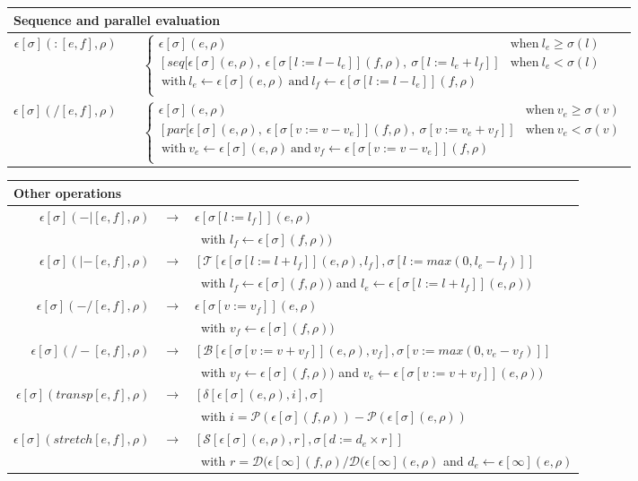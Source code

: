 \documentclass[10pt,a4paper,frenchb]{article}
\makeatletter
\newcommand{\evalsym}{\epsilon}
\newcommand{\eval}[2][\bounds]{\evalsym[#1](#2,\rho)}
\newcommand{\seq}			{:}
\newcommand{\mix}			{/}
\newcommand{\pitch}		{{\mathcal P}}
\newcommand{\dur}			{{\mathcal D}}
\newcommand{\tail}			{{\mathcal T}}
\newcommand{\bottom}		{{\mathcal B}}
\newcommand{\transp}		{\delta}
\renewcommand{\stretch}	{{\mathcal S}}
\newcommand{\bounds}		{\sigma}
\newcommand{\nobounds}	{\infty}
\newcommand{\evaltable}[1][$\rightarrow$]	  {\begin{center} \begin{tabular*}{0.9\linewidth}{rc@{ #1 }l}}
\newcommand{\evaltitle}[1]						{\multicolumn{3}{l}{#1} \\ \hline}
\newcommand{\evaltablend}  		{\end{tabular*}\end{center}}
\newcommand{\evalspace}	  		{\vspace{2mm}\\}
\makeatother
\begin{document}
\evaltable
\hline
\evaltitle {Sequence and parallel  evaluation} 
 $\eval{\seq [e,f]}$	& & $\left\{ \begin{array}{ll}
							\eval{e} & \mathrm{when} \  l_e \geq \bounds(l) \\
							\left[ seq[\eval{e}, \ \eval[{\bounds[l:=l- l_e]}]{f}, \ \bounds[l:=l_e + l_f] \right] & \mathrm{when} \  l_e < \bounds(l) \\
 								\ \mathrm{with} \   l_e \leftarrow \eval{e} \ \mathrm{and} \   l_f \leftarrow \eval[{\bounds[l:=l- l_e]}]{f} &\\
	 							\end{array} \right.$
\evalspace
 $\eval{\mix [e,f]}$	& & $\left\{ \begin{array}{ll}
							\eval{e} & \mathrm{when} \  v_e \geq \bounds(v) \\
							\left[ par[\eval{e}, \ \eval[{\bounds[v:=v- v_e]}]{f}, \ \bounds[v:=v_e + v_f] \right] & \mathrm{when} \  v_e < \bounds(v) \\
 								\ \mathrm{with} \   v_e \leftarrow \eval{e} \ \mathrm{and} \   v_f \leftarrow \eval[{\bounds[v:=v- v_e]}]{f} &\\
	 							\end{array} \right.$ 
\evaltablend

\evaltable[]
\hline
\evaltitle {Other operations} 
 $\eval{-| [e,f]}$			& $\rightarrow$ & $\eval [{\bounds[l:=l_f]}] {e}$  \\
 					& & \ with $l_f \leftarrow \eval{f})$ 
\evalspace
  $\eval{|- [e,f]}$		   	& $\rightarrow$& $[ \tail [\eval[{\bounds[l:=l+l_f]}]{e},l_f], \bounds[l:=max(0,l_e - l_f)]]$  \\
  					& & \ with $l_f \leftarrow \eval{f})$ and $l_e \leftarrow \eval[{\bounds[l:=l+l_f]}]{e})$ 
\evalspace
 $\eval{-/ [e,f]}$			& $\rightarrow$ & $\eval [{\bounds[v:=v_f]}] {e}$  \\
 					& & \ with $v_f \leftarrow \eval{f})$ 
\evalspace
  $\eval{/- [e,f]}$		   	& $\rightarrow$& $[ \bottom [\eval[{\bounds[v:=v+v_f]}]{e},v_f], \bounds[v:=max(0,v_e - v_f)]]$  \\
  					& & \ with $v_f \leftarrow \eval{f})$ and $v_e \leftarrow \eval[{\bounds[v:=v+v_f]}]{e})$ 
 \evalspace
  $\eval{transp[e,f]}$ 		& $\rightarrow$ & $[\transp [\eval{e},i], \bounds]$  \\
  					& & \ with $i = \pitch(\eval{f}) - \pitch(\eval{e}) $ 
  \evalspace
$\eval{stretch[e,f]}$ 		& $\rightarrow$& $[\stretch [\eval{e},r], \bounds[d:=d_e \times r]]$  \\
					& & \ with $r = \dur(\eval[\nobounds]{f} / \dur(\eval[\nobounds]{e}$ and $d_e \leftarrow \eval[\nobounds]{e} $
\evaltablend
\end{document}
